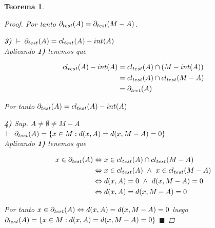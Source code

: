 \documentclass[oneside]{book} %
\theoremstyle{Teorema}
\newtheorem{Teorema}[Definicion]{Teorema}
\theoremstyle{Ejemplos}
\theoremstyle{[Obs]}
\def \test {test}
\newcommand{\cerradura}[2][\test]{\ifx \test #1 {\overline{#2}} \else {cl_{#1}(#2)} \fi} %
\newcommand{\frontera}[2][\test]{\ifx \test #1 {\partial(#2)} \else {\partial_{#1}(#2)} \fi} %
\renewcommand{\{}{\left\lbrace} %
\renewcommand{\}}{\right\rbrace} %
\newcommand{\y}{\ \wedge\ } %
\newcommand{\n}{\cap} %
\renewcommand{\qed}{$\blacksquare$} %
\newcommand{\pd}{$\vdash\ $} %
\begin{document}
\begin{Teorema}
\begin{proof}
					Por tanto $\frontera{A} = \frontera{M - A}$.

					\textbf{3)} \pd $\frontera{A} = \cerradura{A} - int(A)$ \\ 
					Aplicando \textbf{1)} tenemos que

					\begin{align*}
						\cerradura{A} - int(A) &= \cerradura{A} \n (M - int(A)) \\ 
						&= \cerradura{A} \n \cerradura{M - A} \\ 
						&= \frontera{A}
					\end{align*}
					
					Por tanto $\frontera{A} = \cerradura{A} - int(A)$ 

					\textbf{4)} Sup. $A \neq \emptyset \neq M - A$ \\ 
					\pd $\frontera{A} = \{ x \in M : d(x, A) = d(x, M - A) = 0 \}$ \\ 
					Aplicando \textbf{1)} tenemos que

					\begin{align*}
						x \in \frontera{A} & \Leftrightarrow x \in \cerradura{A} \n \cerradura{M - A} \\ 
						& \Leftrightarrow x \in \cerradura{A} \y x \in \cerradura{M - A} \\ 
						& \Leftrightarrow d(x, A) = 0 \y d(x, M - A) = 0 \\ 
						& \Leftrightarrow d(x, A) = d(x, M - A) = 0
					\end{align*}

					Por tanto $x \in \frontera{A} \Leftrightarrow d(x, A) = d(x, M - A) = 0$ luego $\frontera{A} = \{ x \in M : d(x, A) = d(x, M - A) = 0 \}$ \qed

				\end{proof}
			
			\end{Teorema}
\end{document}
